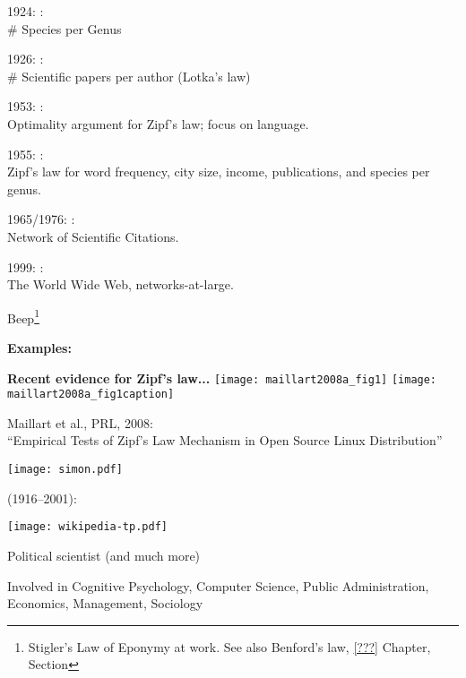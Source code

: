   
    
    
      1924: \cite{yule1924a}:\\ \# Species per Genus
    
      1926: \cite{lotka1926a}:\\ \# Scientific papers per author (Lotka's law)
    
      1953: \cite{mandelbrot1953a}:\\ Optimality argument
      for Zipf's law; focus on language.
    
      1955: \cite{simon1955a,zipf1949a}:\\ Zipf's law for
      word frequency, city size, income, publications, and species per genus.
    
      1965/1976: \cite{price1965a,price1976a}:\\ Network of Scientific Citations.
     
      1999: \cite{barabasi1999a}:\\ The World Wide Web, networks-at-large.
    

      Beep\footnote{Stigler's Law of Eponymy\cite{stigler1980a} at work.
      See also Benford's law, \ref{???} Chapter, Section}
  


  \textbf{Examples:}

  \textbf{Recent evidence for Zipf's law...}
    \texttt{[image: maillart2008a\_fig1]}
    \texttt{[image: maillart2008a\_fig1caption]}

    Maillart et al., PRL, 2008:\\
    ``Empirical Tests of {Z}ipf's Law Mechanism in 
    Open Source {L}inux Distribution''\cite{maillart2008a}
  
  


  
          
      
      \texttt{[image: simon.pdf]}
      
       (1916--2001):
      
      \texttt{[image: wikipedia-tp.pdf]}
      
      
   
    Political scientist (and much more)
   
    Involved in Cognitive Psychology, Computer Science, Public Administration,
    Economics, Management, Sociology
   
